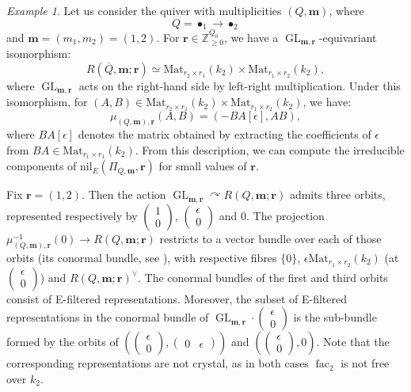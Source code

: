 \documentclass[a4paper,12pt]{article}
\theoremstyle{definition}
\theoremstyle{plain}
\theoremstyle{remark}
\newtheorem{example}[definition]{Example}
\DeclareMathOperator{\fac}{fac}
\DeclareMathOperator{\GL}{GL}
\newcommand\bbZ{\mathbb{Z}}
\newcommand\bfm{\mathbf{m}}
\newcommand\bfr{\mathbf{r}}
\begin{document}
\begin{example}\label{Exmp/NonMaxComponentsTypeC2}\cite[\S 8.2.2]{GLS18a}
Let us consider the quiver with multiplicities $(Q,\bfm)$, where
\[
Q=\bullet_1\longrightarrow\bullet_2
\]
and $\bfm=(m_1,m_2)=(1,2)$. For $\bfr\in\bbZ_{\geq0}^{Q_0}$, we have a $\GL_{\bfm,\bfr}$-equivariant isomorphism:
\[
R(\overline{Q},\bfm;\bfr)\simeq\mathrm{Mat}_{r_2\times r_1}(k_2)\times\mathrm{Mat}_{r_1\times r_2}(k_2)
,
\]
where $\GL_{\bfm,\bfr}$ acts on the right-hand side by left-right multiplication. Under this isomorphism, for $(A,B)\in\mathrm{Mat}_{r_2\times r_1}(k_2)\times\mathrm{Mat}_{r_1\times r_2}(k_2)$, we have:
\[
\mu_{(Q,\bfm),\bfr}(A,B)=(-BA[\epsilon],AB)
,
\]
where $BA[\epsilon]$ denotes the matrix obtained by extracting the coefficients of $\epsilon$ from $BA\in\mathrm{Mat}_{r_1\times r_1}(k_2)$. From this description, we can compute the irreducible components of $\mathrm{nil}_E(\Pi_{Q,\bfm},\bfr)$ for small values of $\bfr$.

Fix $\bfr=(1,2)$. Then the action $\GL_{\bfm,\bfr}\curvearrowright R(Q,\bfm;\bfr)$ admits three orbits, represented respectively by $(\begin{smallmatrix}1 \\ 0\end{smallmatrix})$, $(\begin{smallmatrix}\epsilon \\ 0\end{smallmatrix})$ and $0$. The projection $\mu_{(Q,\bfm),\bfr}^{-1}(0)\rightarrow R(Q,\bfm;\bfr)$ restricts to a vector bundle over each of those orbits (its conormal bundle, see \cite[Prop.\ 4.1.3.ii]{Gin12}), with respective fibres $\{0\}$, $\epsilon\mathrm{Mat}_{r_1\times r_2}(k_2)$ (at $(\begin{smallmatrix}\epsilon \\ 0\end{smallmatrix})$) and $R(Q,\bfm;\bfr)^\vee$. The conormal bundles of the first and third orbits consist of E-filtered representations. Moreover, the subset of E-filtered representations in the conormal bundle of $\GL_{\bfm,\bfr}\cdot (\begin{smallmatrix}\epsilon \\ 0\end{smallmatrix})$ is the sub-bundle formed by the orbits of $\left((\begin{smallmatrix}\epsilon \\ 0\end{smallmatrix}),(\begin{smallmatrix}0 & \epsilon\end{smallmatrix})\right)$ and $\left((\begin{smallmatrix}\epsilon \\ 0\end{smallmatrix}),0\right)$. Note that the corresponding representations are not crystal, as in both cases $\fac_2$ is not free over $k_2$.


\end{example}
\end{document}
